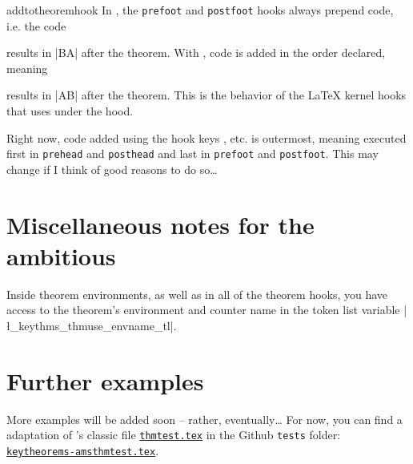 \documentclass{ltxdoc}
\newcommand{\hook}{\texttt}
\begin{document}
\begin{docCommand}{addtotheoremhook}
In , the \hook{prefoot} and \hook{postfoot} hooks always prepend code, i.e. the code
\begin{dispListing}
\end{dispListing}
results in |BA| after the theorem.
With , code is added in the order declared, meaning
\begin{dispListing}
\end{dispListing}
results in |AB| after the theorem.
This is the behavior of the \LaTeX{} kernel hooks that  uses under the hood.

Right now, code added using the hook keys , etc. is outermost, meaning executed first in \hook{prehead} and \hook{posthead} and last in \hook{prefoot} and \hook{postfoot}.
This may change if I think of good reasons to do so\dots
\end{docCommand}

\section{Miscellaneous notes for the ambitious}

Inside theorem environments, as well as in all of the theorem hooks, you have access to the theorem's environment and counter name in the token list variable |\l_keythms_thmuse_envname_tl|.

\section{Further examples}

More examples will be added soon -- rather, eventually\dots{}
For now, you can find a  adaptation of 's classic file \href{https://mirrors.ctan.org/macros/latex/required/amscls/doc/thmtest.tex}{\texttt{thmtest.tex}} in the Github \texttt{tests} folder: \href{https://github.com/mbertucci47/keytheorems/blob/main/tests/keytheorems-amsthmtest.tex}{\texttt{keytheorems-amsthmtest.tex}}.


\printindex
\end{document}
